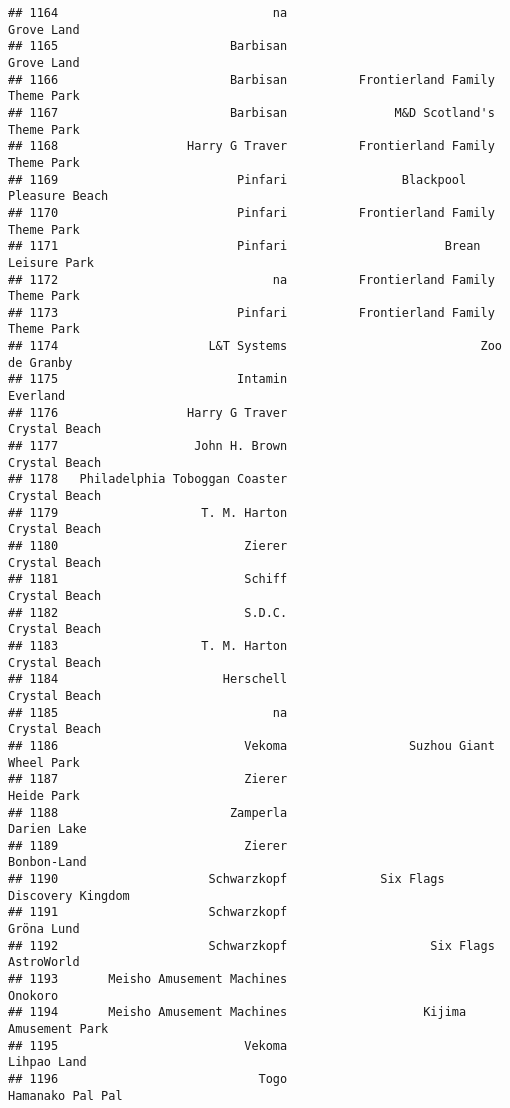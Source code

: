 \documentclass[
]{article}
\begin{document}
\begin{verbatim}
## 1164                              na                              Grove Land
## 1165                        Barbisan                              Grove Land
## 1166                        Barbisan          Frontierland Family Theme Park
## 1167                        Barbisan               M&D Scotland's Theme Park
## 1168                  Harry G Traver          Frontierland Family Theme Park
## 1169                         Pinfari                Blackpool Pleasure Beach
## 1170                         Pinfari          Frontierland Family Theme Park
## 1171                         Pinfari                      Brean Leisure Park
## 1172                              na          Frontierland Family Theme Park
## 1173                         Pinfari          Frontierland Family Theme Park
## 1174                     L&T Systems                           Zoo de Granby
## 1175                         Intamin                                Everland
## 1176                  Harry G Traver                           Crystal Beach
## 1177                   John H. Brown                           Crystal Beach
## 1178   Philadelphia Toboggan Coaster                           Crystal Beach
## 1179                    T. M. Harton                           Crystal Beach
## 1180                          Zierer                           Crystal Beach
## 1181                          Schiff                           Crystal Beach
## 1182                          S.D.C.                           Crystal Beach
## 1183                    T. M. Harton                           Crystal Beach
## 1184                       Herschell                           Crystal Beach
## 1185                              na                           Crystal Beach
## 1186                          Vekoma                 Suzhou Giant Wheel Park
## 1187                          Zierer                              Heide Park
## 1188                        Zamperla                             Darien Lake
## 1189                          Zierer                             Bonbon-Land
## 1190                     Schwarzkopf             Six Flags Discovery Kingdom
## 1191                     Schwarzkopf                              Gröna Lund
## 1192                     Schwarzkopf                    Six Flags AstroWorld
## 1193       Meisho Amusement Machines                                 Onokoro
## 1194       Meisho Amusement Machines                   Kijima Amusement Park
## 1195                          Vekoma                             Lihpao Land
## 1196                            Togo                        Hamanako Pal Pal

\end{verbatim}
\end{document}
